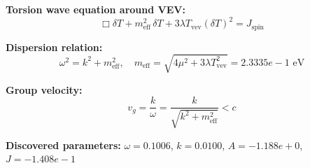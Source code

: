 
\textbf{Torsion wave equation around VEV:}
\begin{equation}
  \Box \delta T + m_{\text{eff}}^2 \, \delta T + 3\lambda T_{\text{vev}} (\delta T)^2 = J_{\text{spin}}
\end{equation}

\textbf{Dispersion relation:}
\begin{equation}
  \omega^2 = k^2 + m_{\text{eff}}^2, \quad
  m_{\text{eff}} = \sqrt{4\mu^2 + 3\lambda T_{\text{vev}}^2} = 2.3335e-1 \text{ eV}
\end{equation}

\textbf{Group velocity:}
\begin{equation}
  v_g = \frac{k}{\omega} = \frac{k}{\sqrt{k^2 + m_{\text{eff}}^2}} < c
\end{equation}

\textbf{Discovered parameters:}
$\omega = 0.1006$, \quad
$k = 0.0100$, \quad
$A = -1.188e+0$, \quad
$J = -1.408e-1$